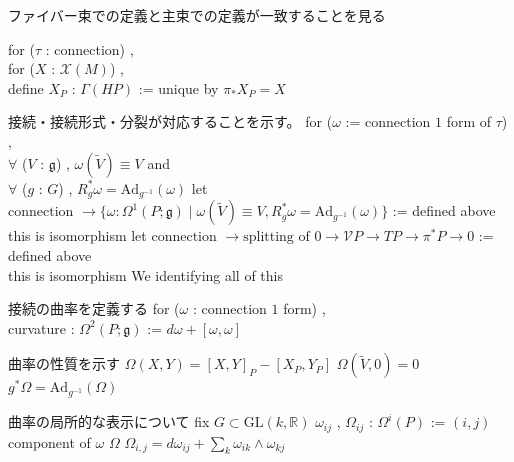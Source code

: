 \begin{Theorem}
\itemnote
  ファイバー束での定義と主束での定義が一致することを見る
\itemprop
  \WIP
\end{Theorem}

\begin{Definition}
\itemprop
  for (\(\tau\) : connection) ,\\
  for (\(X\) : \(\mathcal{X}(M)\)) ,\\
  define \(X_{P}\) : \(\Gamma(HP)\) := unique by \(\pi_* X_P = X\)
\end{Definition}

\begin{Theorem}
\itemnote
  接続・接続形式・分裂が対応することを示す。
\itemprop
  for (\(\omega\) := connection \(1\) form of \(\tau\)) ,\\
  \(\forall\) (\(V\) : \(\mathfrak{g}\)) , \(\omega(\tilde{V}) \equiv V\) and \\
  \(\forall\) (\(g\) : \(G\)) , \(R_g^* \omega = \text{Ad}_{g^{-1}}(\omega)\)
\itemprop
  let \(\text{connection } \to \{\omega : \Omega^1(P ; \mathfrak{g}) \mid \omega(\tilde{V}) \equiv V , R_g^* \omega = \text{Ad}_{g^{-1}}(\omega)\}\) := defined above \\
  this is isomorphism
\itemprop
  let \(\text{connection } \to \text{splitting of } 0 \to \mathcal{V}P \to TP \to \pi^*P \to 0\) := defined above \\
  this is isomorphism
\itemdefi
  We identifying all of this
\end{Theorem}

\begin{Definition}
\itemnote
  接続の曲率を定義する
\itemdefi
  for (\(\omega\) : connection \(1\) form) ,\\
  curvature : \(\Omega^2(P ; \mathfrak{g})\) := \(d \omega + [\omega , \omega]\)
\end{Definition}

\begin{Theorem}
\itemnote
  曲率の性質を示す
\itemdefi
  \(\Omega(X , Y) = [X , Y]_P - [X_P , Y_P]\)
\itemdefi
  \(\Omega(\tilde{V} , 0) = 0\)
\itemdefi
  \(g^* \Omega = \text{Ad}_{g^{-1}}(\Omega)\)
\end{Theorem}

\begin{Theorem}
\itemnote
  曲率の局所的な表示について
\itemwhen fix \(G \subset \text{GL}(k , \mathbb{R})\)
\itemdefi
  \(\omega_{ij}\) , \(\Omega_{ij}\) : \(\Omega^i(P)\) := \((i,j)\) component of \(\omega\) \(\Omega\)
\itemprop
  \(\Omega_{i,j} = d \omega_{ij} + \sum_k \omega_{ik} \wedge \omega_{kj}\)
\end{Theorem}


